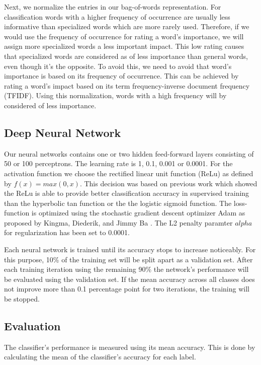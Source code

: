 \documentclass[sigconf]{acmart}
\begin{document}
Next, we normalize the entries in our bag-of-words representation. For classification words with a higher frequency of occurrence are usually less informative than specialized words which are more rarely used. Therefore, if we would use the frequency of occurrence for rating a word's importance, we will assign more specialized words a less important impact. This low rating causes that specialized words are considered as of less importance than general words, even though it's the opposite. To avoid this, we need to avoid that word's importance is based on its frequency of occurrence. This can be achieved by rating a word's impact based on its term frequency-inverse document frequency (TFIDF). Using this normalization, words with a high frequency will by considered of less importance.

\subsection{Deep Neural Network}

Our neural networks contains one or two hidden feed-forward layers consisting of 50 or 100 perceptrons. The learning rate is 1, 0.1, 0.001 or 0.0001. For the activation function we choose the rectified linear unit function (ReLu) as defined by $f(x) = max(0, x)$. This decision was based on previous work which showed the ReLu is able to provide better classification accuracy in supervised training than the hyperbolic tan function or the the logistic sigmoid function\cite{pmlr-v15-glorot11a}. The loss-function is optimized using the stochastic gradient descent optimizer Adam as proposed by Kingma, Diederik, and Jimmy Ba \cite{adam}. The L2 penalty paramter $alpha$ for regularization has been set to 0.0001.

Each neural network is trained until its accuracy stops to increase noticeably. For this purpose, 10\% of the training set will be split apart as a validation set. After each training iteration using the remaining 90\% the network's performance will be evaluated using the validation set. If the mean accuracy across all classes does not improve more than 0.1 percentage point for two iterations, the training will be stopped. 

\subsection{Evaluation}

The classifier's performance is measured using its mean accuracy. This is done by calculating the mean of the classifier's accuracy for each label.
\end{document}
